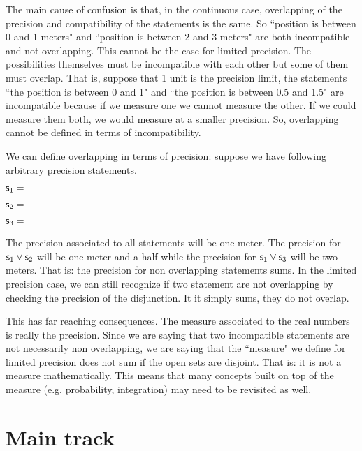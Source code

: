 \documentclass[11pt,letterpaper,fleqn]{memoir} %
\begin{document}
The main cause of confusion is that, in the continuous case, overlapping of the precision and compatibility of the statements is the same. So ``position is between 0 and 1 meters" and ``position is between 2 and 3 meters" are both incompatible and not overlapping. This cannot be the case for limited precision. The possibilities themselves must be incompatible with each other but some of them must overlap. That is, suppose that 1 unit is the precision limit, the statements ``the position is between 0 and 1" and ``the position is between 0.5 and 1.5" are incompatible because if we measure one we cannot measure the other. If we could measure them both, we would measure at a smaller precision. So, overlapping cannot be defined in terms of incompatibility.

We can define overlapping in terms of precision: suppose we have following arbitrary precision statements.
\begin{description}
	\item $\mathsf{s}_1=$
	\item $\mathsf{s}_2=$
	\item $\mathsf{s}_3=$
\end{description}

The precision associated to all statements will be one meter. The precision for $\mathsf{s}_1\vee\mathsf{s}_2$ will be one meter and a half while the precision for $\mathsf{s}_1\vee\mathsf{s}_3$ will be two meters. That is: the precision for non overlapping statements sums. In the limited precision case, we can still recognize if two statement are not overlapping by checking the precision of the disjunction. It it simply sums, they do not overlap.

This has far reaching consequences. The measure associated to the real numbers is really the precision. Since we are saying that two incompatible statements are not necessarily non overlapping, we are saying that the ``measure" we define for limited precision does not sum if the open sets are disjoint. That is: it is not a measure mathematically. This means that many concepts built on top of the measure (e.g. probability, integration) may need to be revisited as well.

\section{Main track}
\end{document}
